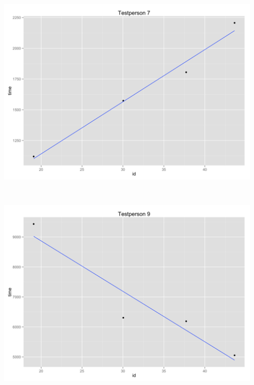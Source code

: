 \begin{minipage}{\linewidth}
	\begin{minipage}[b]{.45\linewidth}
		\includegraphics[width=\textwidth]{images/plots/plot_model_test_navigation_1}
		\label{fig:navigationtest1}
	\end{minipage}
	\begin{minipage}[b]{0.1\linewidth}
	~
	\end{minipage}
	\begin{minipage}[b]{0.45\linewidth}
		\includegraphics[width=\textwidth]{images/plots/plot_model_test_navigation_2}
		\label{fig:navigationtest2}
	\end{minipage}
\end{minipage}

